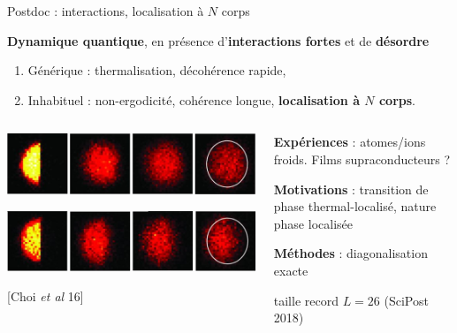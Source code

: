 \begin{frame}{Postdoc : interactions, localisation à $N$ corps}
\begin{block}{\textbf{Dynamique quantique}, en présence d'\textbf{interactions fortes} et de \textbf{désordre}}
	\begin{enumerate}
		\item Générique :  \textcolor{comp}{thermalisation, décohérence rapide},
		\item Inhabituel : \textcolor{BostonBlue}{non-ergodicité, cohérence longue, \textbf{localisation à $N$ corps}}.
	\end{enumerate}
\end{block}

\begin{columns}
\begin{column}{0.5\textwidth}
\centering
\includegraphics[width=0.9\columnwidth]{img/1_travaux/Imbalance_Choi_thermal}

\includegraphics[width=0.9\columnwidth]{img/1_travaux/Imbalance_Choi}

[Choi \emph{et al} 16]
\end{column}
\begin{column}{0.5\textwidth}
\textbf{Expériences} : atomes/ions froids. Films supraconducteurs ?

\textbf{Motivations} : transition de phase thermal-localisé, nature phase localisée

\textbf{Méthodes} : diagonalisation exacte

taille record $L=26$ (SciPost 2018)
\end{column}
\end{columns}
\end{frame}

